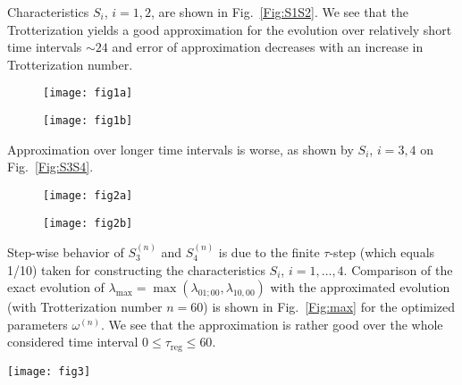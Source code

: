 \documentclass[pra,preprint,showpacs]{revtex4-1}
\begin{document}
{{Characteristics $S_i$, $i=1,2$, are shown in Fig.~\ref{Fig:S1S2}. We see that the Trotterization yields a good approximation for the evolution over relatively short time intervals $\sim 24$ and error of approximation decreases with an increase in Trotterization number.

\begin{figure*}[!]
\centering
    \begin{subfigure}[c]{0.49\textwidth}
    \centering
    \texttt{[image: fig1a]}
  \caption{}
  \end{subfigure}
  \begin{subfigure}[c]{0.49\textwidth}
  \centering
  \texttt{[image: fig1b]}
  \caption{}
  \end{subfigure}
\caption{The $\tau$-dependence of the characteristics $S^{(n)}_1$ (a) and $S^{(n)}_2$ (b). Here $N=6$, $N^{(S)}=N^{(R)}=2$.}
\label{Fig:S1S2}
\end{figure*}
Approximation over longer time intervals is worse, as shown by   $S_i$, $i=3,4$  on Fig.~\ref{Fig:S3S4}.
\begin{figure*}[!]
\centering
    \begin{subfigure}[c]{0.49\textwidth}
    \centering
    \texttt{[image: fig2a]}
  \caption{}
  \end{subfigure}
  \begin{subfigure}[c]{0.49\textwidth}
  \centering
  \texttt{[image: fig2b]}
  \caption{}
  \end{subfigure}
\caption{The $\tau$-dependence of  the characteristics $S^{(n)}_3$ (a) and $S^{(n)}_4$ (b). The Trotterization number $n$ decreases in upward direction taking values 60, 30, 20, 10.
Here $N=6$, $N^{(S)}=N^{(R)}=2$.}
\label{Fig:S3S4}
\end{figure*}
Step-wise behavior of $S_3^{(n)}$ and $S_4^{(n)}$ is due to the finite $\tau$-step (which equals 1/10) taken for constructing the characteristics $S_i$, $i=1,\dots,4$. Comparison of the exact evolution of $\lambda_{\max}=\max(\lambda_{01;00},\lambda_{10,00})$ with the approximated  evolution (with Trotterization number $n=60$) is shown in Fig.~\ref{Fig:max} for the optimized parameters $\omega^{(n)}$. We see that the approximation is rather good over the whole considered time interval $0\le{\tau_{\mathrm{reg}}}\le 60$.
\begin{figure*}[!]
\centering
\texttt{[image: fig3]}
\caption{The $\tau$-dependence of the maximal scale factor $\lambda_{\max}=\max(\lambda_{01;00},\lambda_{10,00})$. Both the exact and Troterrized ($n=60$) evolutions are shown. Here $N=6$, $N^{(S)}=N^{(R)}=2$.
}
\label{Fig:max}
\end{figure*}

}}
\end{document}
